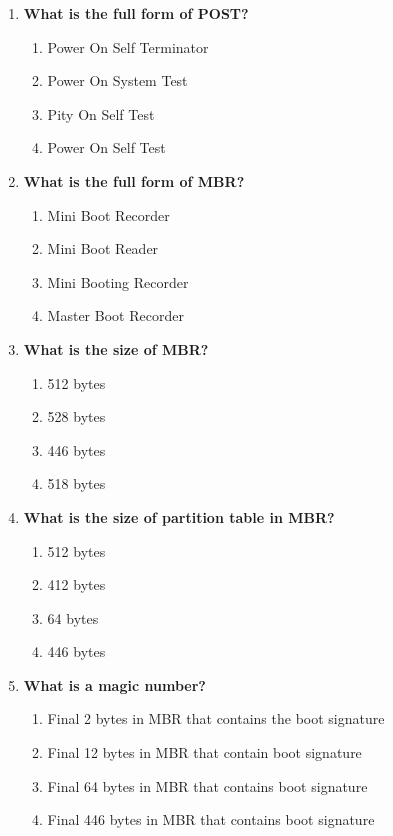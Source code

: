 \begin{flushleft}
\begin{enumerate}
		\item \textbf{What is the full form of POST?		}	
		\begin{enumerate}[label=(\alph*)]
			\item Power On Self Terminator
			\item Power On System Test    
			\item Pity On Self Test    
			\item Power On Self Test    %
		\end{enumerate}
		\bigskip
		\bigskip	
		\newpage
		\item \textbf{What is the full form of MBR?}
		\begin{enumerate}[label=(\alph*)]
			\item Mini Boot Recorder
			\item Mini Boot Reader
			\item Mini Booting Recorder   
			\item Master Boot Recorder    %
		\end{enumerate}
		\bigskip
		\bigskip	
		
		\item \textbf{What is the size of MBR?}
		\begin{enumerate}[label=(\alph*)]
			\item 512 bytes   %
			\item 528 bytes  
			\item 446 bytes 
			\item 518 bytes   
		\end{enumerate}
		\bigskip
		\bigskip	

		\item \textbf{What is the size of partition table in MBR?}
		\begin{enumerate}[label=(\alph*)]
			\item 512 bytes
			\item 412 bytes   
			\item 64 bytes     %
			\item 446 bytes   
		\end{enumerate}
		\bigskip
		\bigskip	

		\item \textbf{What is a magic number?}
		\begin{enumerate}[label=(\alph*)]
			\item Final 2 bytes in MBR that contains the boot signature    
			\item Final 12 bytes in MBR that contain boot signature    
			\item Final 64 bytes in MBR that contains boot signature    
			\item Final 446 bytes in MBR that contains boot signature    %
		\end{enumerate}
		\bigskip
		\bigskip	


\end{enumerate}
\end{flushleft}
